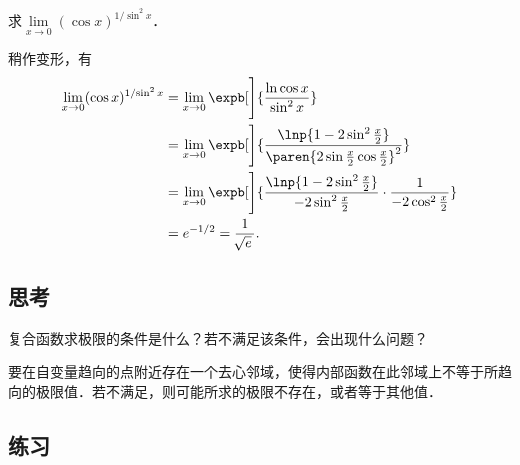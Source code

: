 \begin{example*}
  求\(\lim\limits_{x\to0} (\cos x)^{1/\!\sin^2 x}\)．

  \begin{remark}
    稍作变形，有
    \begin{align*}
      \lim_{x\to0} (\cos x)^{1/\!\sin^2 x}
      &= \lim_{x\to0} \expb[\Bigg]{\frac{\ln \cos x}{\sin^2 x}} \\
      &= \lim_{x\to0} \expb[\Bigg]{
        \frac{\lnp{1 - 2 \sin^2 \frac x2}}{
        \paren{2 \sin\frac x2 \cos\frac x2}^2}} \\
      &= \lim_{x\to0} \expb[\Bigg]{
        \frac{\lnp{1 - 2 \sin^2 \frac x2}}{-2 \sin^2 \frac x2}
        \cdot \frac{1}{-2 \cos^2 \frac x2}} \\
      &= e^{-1/2} = \frac1{\!\sqrt e\,}.
    \end{align*}
  \end{remark}
\end{example*}

\subsection*{思考}

复合函数求极限的条件是什么？若不满足该条件，会出现什么问题？

\ifshowsolp
\pskip
要在自变量趋向的点附近存在一个去心邻域，使得内部函数在此邻域上不等于所趋向的极限值．若不满足，则可能所求的极限不存在，或者等于其他值．
\fi

\ifshowex
{}
\subsection*{练习}

